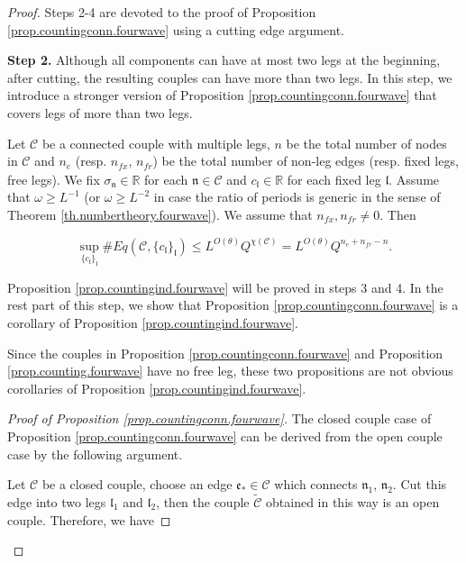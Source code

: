 \begin{proof}
    Steps 2-4 are devoted to the proof of Proposition \ref{prop.countingconn.fourwave} using a cutting edge argument. 
    
    
    \textbf{Step 2.} Although all components can have at most two legs at the beginning, after cutting, the resulting couples can have more than two legs. In this step, we introduce a stronger version of Proposition \ref{prop.countingconn.fourwave} that covers legs of more than two legs.
    
    \begin{lem}\label{prop.countingind.fourwave}
    Let $\mathcal{C}$ be a connected couple with multiple legs, $n$ be the total number of nodes in $\mathcal{C}$ and $n_e$ (resp. $n_{\textit{fx}}$, $n_{\textit{fr}}$) be the total number of non-leg edges (resp. fixed legs, free legs). We fix $\sigma_{\mathfrak{n}}\in\mathbb{R}$ for each $\mathfrak{n}\in \mathcal{C}$ and $c_{\mathfrak{l}}\in \mathbb{R}$ for each fixed leg $\mathfrak{l}$. Assume that $\omega\ge L^{-1}$ (or $\omega\ge L^{-2}$ in case the ratio of periods is generic in the sense of Theorem \ref{th.numbertheory.fourwave}). We assume that $n_{\textit{fx}},n_{\textit{fr}}\ne 0$. Then 
    
    \begin{equation}\label{eq.countingbd3.fourwave}
    \sup_{\{c_{\mathfrak{l}}\}_{\mathfrak{l}}}\#Eq(\mathcal{C},\{c_{\mathfrak{l}}\}_{\mathfrak{l}})\leq L^{O(\theta)} Q^{\chi(\mathcal{C})} = L^{O(\theta)} Q^{n_e+n_{\textit{fr}}-n}.
    \end{equation}
    
    \end{lem}
    
    Proposition \ref{prop.countingind.fourwave} will be proved in steps 3 and 4. In the rest part of this step, we show that Proposition \ref{prop.countingconn.fourwave} is a corollary of Proposition \ref{prop.countingind.fourwave}.
    
    Since the couples in Proposition \ref{prop.countingconn.fourwave} and Proposition \ref{prop.counting.fourwave} have no free leg, these two propositions are not obvious corollaries of Proposition \ref{prop.countingind.fourwave}.
    
    \begin{proof}[Proof of Proposition \ref{prop.countingconn.fourwave}]
    The closed couple case of Proposition \ref{prop.countingconn.fourwave} can be derived from the open couple case by the following argument.
    
    Let $\mathcal{C}$ be a closed couple, choose an edge $\mathfrak{e}_{*}\in \mathcal{C}$ which connects $\mathfrak{n}_1$, $\mathfrak{n}_2$. Cut this edge into two legs $\mathfrak{l}_1$ and $\mathfrak{l}_2$, then the couple $\widetilde{\mathcal{C}}$ obtained in this way is an open couple. Therefore, we have
    

\end{proof}
\end{proof}

